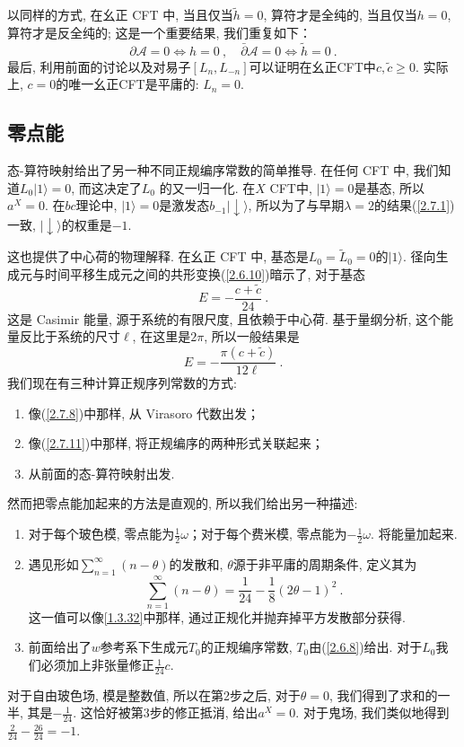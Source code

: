 以同样的方式, 在幺正 CFT 中, 当且仅当$\tilde{h}=0$, 算符才是全纯的, 当且仅当$h=0$, 算符才是反全纯的; 这是一个重要结果, 我们重复如下：
\begin{equation}
\partial \mathscr{A}=0 \Leftrightarrow h=0 \:, \quad \bar{\partial} \mathscr{A}=0 \Leftrightarrow \tilde{h}=0 \:. \label{2.9.16}
\end{equation}
最后, 利用前面的讨论以及对易子$\left[L_{n}, L_{-n}\right]$可以证明在幺正CFT中$c, \tilde{c} \geq 0$. 实际上, $c=0$的唯一幺正CFT是平庸的: $L_n=0$. 

\subsection*{零点能}
态-算符映射给出了另一种不同正规编序常数的简单推导. 在任何 CFT 中, 我们知道$L_{0}|1\rangle=0$, 而这决定了$L_0$ 的又一归一化.
在$X$ CFT中, $|1\rangle=0$是基态, 所以$a^X=0$. 在$bc$理论中, $|1\rangle=0$是激发态$b_{-1}\lvert \downarrow\rangle$, 所以为了与早期$\lambda=2$的结果(\ref{2.7.1}) 一致,  $\lvert \downarrow\rangle$的权重是$-1$.

这也提供了中心荷的物理解释. 在幺正 CFT 中, 基态是$L_{0}=\tilde{L}_{0}=0$的$|1\rangle$. 
径向生成元与时间平移生成元之间的共形变换(\ref{2.6.10})暗示了, 对于基态
\begin{equation}
E=-\frac{c+\tilde{c}}{24} \:. \label{2.9.17}
\end{equation}
这是 Casimir 能量, 源于系统的有限尺度, 且依赖于中心荷. 基于量纲分析, 这个能量反比于系统的尺寸$\ell$, 在这里是$2\pi$, 所以一般结果是
\begin{equation}
E=-\frac{\pi(c+\tilde{c})}{12 \ell} \:. \label{2.9.18}
\end{equation}
我们现在有三种计算正规序列常数的方式:
\begin{enumerate}
	\item 像(\ref{2.7.8})中那样, 从 Virasoro 代数出发；
	\item 像(\ref{2.7.11})中那样, 将正规编序的两种形式关联起来；
	\item 从前面的态-算符映射出发.
\end{enumerate}
然而把零点能加起来的方法是直观的, 所以我们给出另一种描述:
\begin{enumerate}
	\item 对于每个玻色模, 零点能为$\frac{1}{2} \omega$；对于每个费米模, 零点能为$-\frac{1}{2} \omega$. 将能量加起来.
	\item 遇见形如$\sum_{n=1}^{\infty}(n-\theta)$的发散和,  $\theta$源于非平庸的周期条件, 定义其为
	\begin{equation}
	\sum_{n=1}^{\infty}(n-\theta)=\frac{1}{24}-\frac{1}{8}(2 \theta-1)^{2} \:. \label{2.9.19}
	\end{equation}
	这一值可以像\eqref{1.3.32}中那样, 通过正规化并抛弃掉平方发散部分获得.
	\item 前面给出了$w$参考系下生成元$T_0$的正规编序常数, $T_0$由(\ref{2.6.8})给出. 对于$L_0$我们必须加上非张量修正$\frac{1}{24} c$.
\end{enumerate}
对于自由玻色场, 模是整数值, 所以在第2步之后, 对于$\theta=0$, 我们得到了求和的一半, 其是$-\frac{1}{24} $. 这恰好被第3步的修正抵消, 给出$a^X=0$. 对于鬼场, 我们类似地得到$\frac{2}{24}-\frac{26}{24}=-1$.
